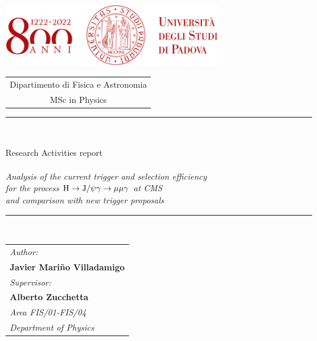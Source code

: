 \documentclass[11pt, a4paper]{article}
\renewcommand{\H}{{\rm H}}
\newcommand{\JPsi}{{\rm J}/\psi}
\begin{document}
\pagestyle{empty}

\begin{center}
\vspace{3em}
\includegraphics[width=25em]{images/logo_800anni.png}\\
\vspace{3em}
\begin{tabular}[c]{c}
{\large\color{unipd} \sc Dipartimento di Fisica e Astronomia} \vspace{0.5em}\\
{\large\color{unipd} \sc MSc in Physics} \vspace{2.7em}\mbox{}
\end{tabular}

\vspace{2cm}
\rule{65mm}{0.2mm}\\
\vspace{1cm}

{\sc\LARGE Research Activities report}\\$\ $\\
{\sl\large  Analysis of the current trigger and selection efficiency}\\ 
{\sl\large  for the process $\H \rightarrow \JPsi\gamma \rightarrow \mu\mu\gamma$ at CMS}\\
{\sl\large  and comparison with new trigger proposals}

\vspace{0.5cm}
\rule{65mm}{0.2mm}\\
\vspace{2cm}
\end{center}

\vspace{\fill}
\begin{tabular}{l}
{\sl\large Author:} \\
{\bf\Large Javier Mariño Villadamigo}
\vspace{1em}\mbox{} \\

{\sl\large Supervisor:} \\
{\bf\large Alberto Zucchetta} \\
{\sl\large Area FIS/01-FIS/04}\\
{\sl\large Department of Physics}
\vspace{1em}\mbox{} \\
\end{tabular}
\end{document}
